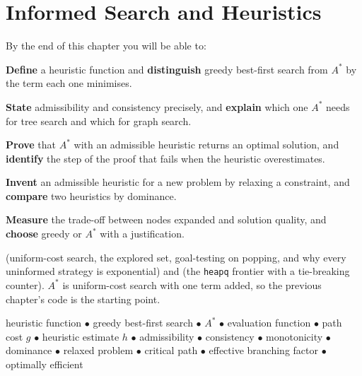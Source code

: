 \chapter{Informed Search and Heuristics}\label{ch:informed}

\begin{outcomes}
By the end of this chapter you will be able to:
\begin{tight}
  \item \textbf{Define} a heuristic function and \textbf{distinguish} greedy
        best-first search from $A^{*}$ by the term each one minimises.
  \item \textbf{State} admissibility and consistency precisely, and
        \textbf{explain} which one $A^{*}$ needs for tree search and which for
        graph search.
  \item \textbf{Prove} that $A^{*}$ with an admissible heuristic returns an optimal
        solution, and \textbf{identify} the step of the proof that fails when the
        heuristic overestimates.
  \item \textbf{Invent} an admissible heuristic for a new problem by relaxing a
        constraint, and \textbf{compare} two heuristics by dominance.
  \item \textbf{Measure} the trade-off between nodes expanded and solution quality,
        and \textbf{choose} greedy or $A^{*}$ with a justification.
\end{tight}
\end{outcomes}

\begin{prereq}
 (uniform-cost search, the explored set, goal-testing on
popping, and why every uninformed strategy is exponential) and  (the
\texttt{heapq} frontier with a tie-breaking counter). $A^{*}$ is uniform-cost
search with one term added, so the previous chapter's code is the starting point.
\end{prereq}

\begin{keyterms}
heuristic function $\bullet$ greedy best-first search $\bullet$ $A^{*}$ $\bullet$
evaluation function $\bullet$ path cost $g$ $\bullet$ heuristic estimate $h$
$\bullet$ admissibility $\bullet$ consistency $\bullet$ monotonicity $\bullet$
dominance $\bullet$ relaxed problem $\bullet$ critical path $\bullet$ effective
branching factor $\bullet$ optimally efficient
\end{keyterms}

